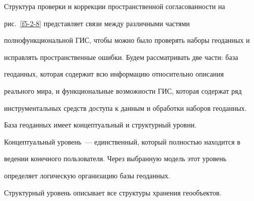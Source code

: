     


    Структура проверки и коррекции пространственной согласованности на 


рис.~\ref{f5-2-8} представляет связи между различными частями 


полнофункциональной ГИС, чтобы можно было проверять наборы геоданных и 


исправлять пространственные ошибки. Будем рассматривать две части: база 


геоданных, которая содержит всю информацию относительно описания 


реального мира, и функциональные возможности ГИС, которая содержат ряд 


инструментальных средств доступа к данным и обработки наборов геоданных. 


     


     


    База геоданных имеет концептуальный и структурный уровни. 


Концептуальный уровень~--- единственный, который полностью находится в 


ведении конечного пользователя. Через выбранную модель этот уровень 


определяет логическую организацию  базы геоданных. 


    


    Структурный уровень описывает все структуры хранения геообъектов. 





